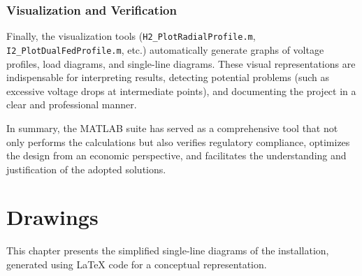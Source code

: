 \documentclass[12pt, a4paper]{report}
\begin{document}
\subsection{Visualization and Verification}
Finally, the visualization tools (\texttt{H2\_PlotRadialProfile.m}, \texttt{I2\_PlotDualFedProfile.m}, etc.) automatically generate graphs of voltage profiles, load diagrams, and single-line diagrams. These visual representations are indispensable for interpreting results, detecting potential problems (such as excessive voltage drops at intermediate points), and documenting the project in a clear and professional manner.

In summary, the MATLAB suite has served as a comprehensive tool that not only performs the calculations but also verifies regulatory compliance, optimizes the design from an economic perspective, and facilitates the understanding and justification of the adopted solutions.

\chapter{Drawings}
\label{chap:planos}
This chapter presents the simplified single-line diagrams of the installation, generated using LaTeX code for a conceptual representation.
\end{document}
